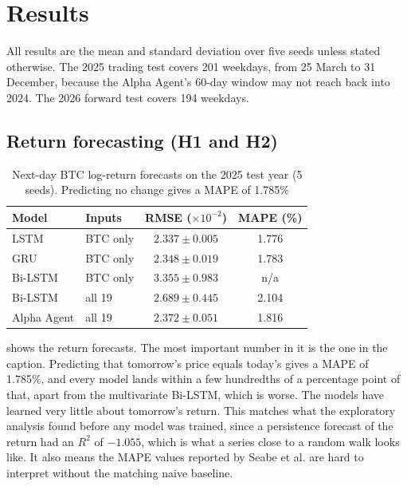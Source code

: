 \section{Results}\label{sec:results}

All results are the mean and standard deviation over five seeds unless stated otherwise. The 2025 trading test covers 201 weekdays, from 25 March to 31 December, because the Alpha Agent's 60-day window may not reach back into 2024. The 2026 forward test covers 194 weekdays.

\subsection{Return forecasting (H1 and H2)}\label{sec:res-forecast}

\begin{table}[!t]
  \centering
  \caption{Next-day BTC log-return forecasts on the 2025 test year (5 seeds). Predicting no change gives a MAPE of 1.785\%}
  \label{tab:forecast}
  \footnotesize
  \setlength{\tabcolsep}{4pt}
  \begin{tabular}{@{}llcc@{}}
    \toprule
    Model & Inputs & RMSE ($\times10^{-2}$) & MAPE (\%) \\
    \midrule
    LSTM        & BTC only & $2.337 \pm 0.005$ & 1.776 \\
    GRU         & BTC only & $2.348 \pm 0.019$ & 1.783 \\
    Bi-LSTM     & BTC only & $3.355 \pm 0.983$ & n/a   \\
    Bi-LSTM     & all 19   & $2.689 \pm 0.445$ & 2.104 \\
    Alpha Agent & all 19   & $2.372 \pm 0.051$ & 1.816 \\
    \bottomrule
  \end{tabular}
\end{table}

 shows the return forecasts. The most important number in it is the one in the caption. Predicting that tomorrow's price equals today's gives a MAPE of 1.785\%, and every model lands within a few hundredths of a percentage point of that, apart from the multivariate Bi-LSTM, which is worse. The models have learned very little about tomorrow's return. This matches what the exploratory analysis found before any model was trained, since a persistence forecast of the return had an $R^2$ of $-1.055$, which is what a series close to a random walk looks like. It also means the MAPE values reported by Seabe et al. \cite{seabe2023} are hard to interpret without the matching naive baseline.

